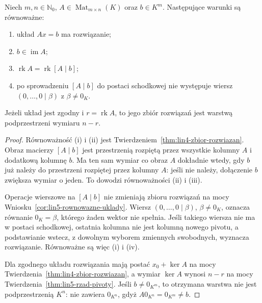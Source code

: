 \begin{twierdzenie}
\label{thm:lin5-zgodnosc}
Niech \(m,n\in\mathbb N_0\),
\(A\in\operatorname{Mat}_{m\times n}(K)\)
oraz \(b\in K^m\).
Następujące warunki są równoważne:
\begin{enumerate}[label=(\roman*)]
\item układ \(Ax=b\) ma rozwiązanie;
\item \(b\in\operatorname{im}A\);
\item \(\operatorname{rk}A=\operatorname{rk}[A\mid b]\);
\item po sprowadzeniu \([A\mid b]\) do postaci
schodkowej nie występuje wiersz
\((0,\ldots,0\mid\beta)\) z \(\beta\ne0_K\).
\end{enumerate}
Jeżeli układ jest zgodny i
\(r=\operatorname{rk}A\), to jego zbiór rozwiązań
jest warstwą podprzestrzeni wymiaru \(n-r\).
\end{twierdzenie}
\begin{proof}
Równoważność (i) i (ii) jest
Twierdzeniem~\ref{thm:lin4-zbior-rozwiazan}.
Obraz macierzy \([A\mid b]\) jest
przestrzenią rozpiętą przez wszystkie
kolumny \(A\) i dodatkową kolumnę \(b\).
Ma ten sam wymiar co obraz \(A\)
dokładnie wtedy, gdy \(b\) już należy
do przestrzeni rozpiętej przez kolumny \(A\):
jeśli nie należy, dołączenie \(b\)
zwiększa wymiar o jeden.
To dowodzi równoważności (ii) i (iii).

Operacje wierszowe na \([A\mid b]\)
nie zmieniają zbioru rozwiązań
na mocy Wniosku~\ref{cor:lin5-rownowazne-uklady}.
Wiersz \((0,\ldots,0\mid\beta)\),
\(\beta\ne0_K\), oznacza równanie
\(0_K=\beta\), którego żaden wektor
nie spełnia. Jeśli takiego wiersza
nie ma w postaci schodkowej, ostatnia
kolumna nie jest kolumną nowego pivotu,
a podstawianie wstecz, z dowolnym wyborem
zmiennych swobodnych, wyznacza rozwiązanie.
Równoważne są więc (i) i (iv).

Dla zgodnego układu rozwiązania mają
postać \(x_0+\ker A\) na mocy
Twierdzenia~\ref{thm:lin4-zbior-rozwiazan},
a wymiar \(\ker A\) wynosi \(n-r\)
na mocy Twierdzenia~\ref{thm:lin5-rzad-pivoty}.
Jeśli \(b\ne0_{K^m}\), to otrzymana warstwa
nie jest podprzestrzenią \(K^n\): nie zawiera
\(0_{K^n}\), gdyż \(A0_{K^n}=0_{K^m}\ne b\).
\end{proof}

